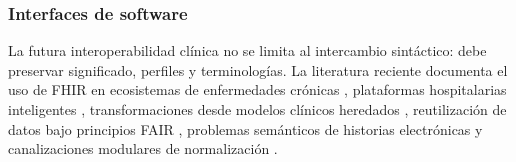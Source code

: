 \documentclass[11pt,a4paper]{article}
\begin{document}
	\subsubsection{ Interfaces de software}
	
	La futura interoperabilidad clínica no se limita al intercambio sintáctico:
	debe preservar significado, perfiles y terminologías. La literatura reciente
	documenta el uso de FHIR en ecosistemas de enfermedades crónicas
	\cite{fhirchronic2024}, plataformas hospitalarias inteligentes
	\cite{smartfhir2024}, transformaciones desde modelos clínicos heredados
	\cite{bossenko2024}, reutilización de datos bajo principios FAIR
	\cite{jamiafair2024}, problemas semánticos de historias electrónicas
	\cite{jmirfhir2024} y canalizaciones modulares de normalización
	\cite{fhirpipeline2025}.
	
\end{document}
